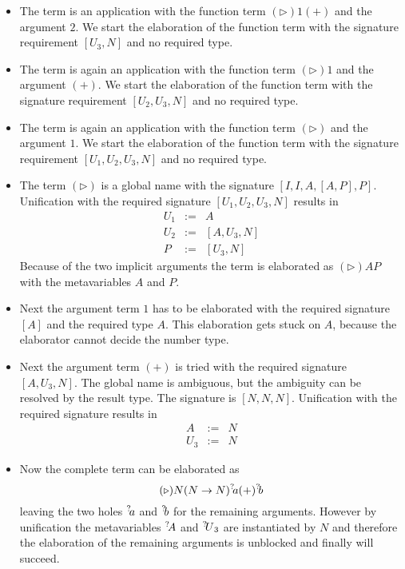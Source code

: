 \begin{itemize}
    \item The term is an application with the function term $(\triangleright) 1
        (+)$ and the argument $2$. We start the elaboration of the function term
        with the signature requirement $[U_3, N]$ and no required type.

    \item The term is again an application with the function term
        $(\triangleright) 1$ and the argument $(+)$. We start the elaboration
        of the function term with the signature requirement $[U_2, U_3, N]$ and
        no required type.

    \item The term is again an application with the function term
        $(\triangleright)$ and the argument $1$. We start the elaboration of the
        function term with the signature requirement $[U_1, U_2, U_3, N]$ and no
        required type.

    \item The term $(\triangleright)$ is a global name with the signature $[I,
        I, A, [A, P], P]$. Unification with the required signature $[U_1, U_2,
        U_3, N]$ results in
        $$
        \begin{array}{lll}
            U_1 &:=& A
            \\
            U_2 &:=& [A, U_3, N]
            \\
            P   &:=& [U_3, N]
        \end{array}
        $$
        Because of the two implicit arguments the term is elaborated as
        $(\triangleright)A P$ with the metavariables $A$ and $P$.

    \item Next the argument term $1$ has to be elaborated with the required
        signature $[A]$ and the required type $A$. This elaboration gets stuck
        on $A$, because the elaborator cannot decide the number type.

    \item Next the argument term $(+)$ is tried with the required signature $[A,
        U_3, N]$. The global name is ambiguous, but the ambiguity can be
        resolved by the result type. The signature is $[N, N, N]$. Unification
        with the required signature results in
        $$
        \begin{array}{lll}
            A &:=& N
            \\
            U_3 &:=& N
        \end{array}
        $$

    \item Now the complete term can be elaborated as
        $$
            (\triangleright) N (N \to N) {{}^? \kern-0.2em a} (+) {{}^? \kern-0.2em b}
        $$
        leaving the two holes ${{}^? \kern-0.2em a}$ and ${{}^? \kern-0.2em b}$ for the remaining
        arguments. However by unification the metavariables ${{}^? \kern-0.2em A}$ and ${{}^? \kern-0.2em U}_3$ are instantiated by $N$ and therefore the elaboration of the
        remaining arguments is unblocked and finally will succeed.
\end{itemize}
